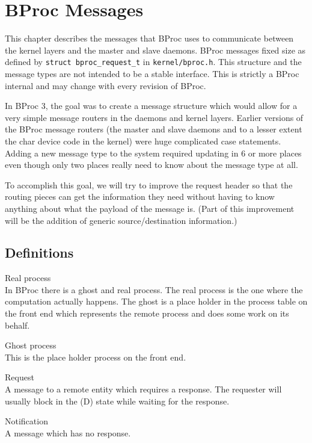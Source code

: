 
%

\chapter{BProc Messages}

This chapter describes the messages that BProc uses to communicate
between the kernel layers and the master and slave daemons.  BProc
messages fixed size as defined by \texttt{struct bproc\_request\_t} in
\texttt{kernel/bproc.h}.  This structure and the message types are not
intended to be a stable interface.  This is strictly a BProc internal
and may change with every revision of BProc.

In BProc 3, the goal was to create a message structure which would
allow for a very simple message routers in the daemons and kernel
layers.  Earlier versions of the BProc message routers (the master and
slave daemons and to a lesser extent the char device code in the
kernel) were huge complicated case statements.  Adding a new message
type to the system required updating in 6 or more places even though
only two places really need to know about the message type at all.

To accomplish this goal, we will try to improve the request header so
that the routing pieces can get the information they need without
having to know anything about what the payload of the message is.
(Part of this improvement will be the addition of generic
source/destination information.)

\section{Definitions}
\begin{description}

\item{Real process}\\
In BProc there is a ghost and real process.  The real process is the
one where the computation actually happens.  The ghost is a place
holder in the process table on the front end which represents the
remote process and does some work on its behalf.

\item{Ghost process}\\
This is the place holder process on the front end.

\item{Request}\\
A message to a remote entity which requires a response.  The requester
will usually block in the (D) state while waiting for the response.

\item{Notification}\\
A message which has no response.
\end{description}


